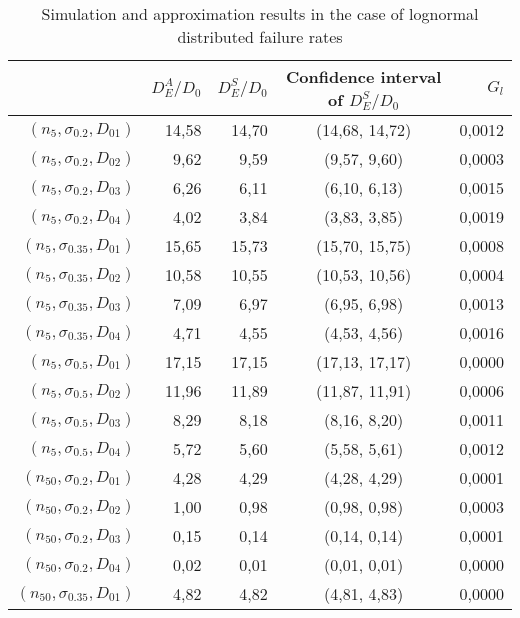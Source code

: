 \documentclass[preprint,12pt]{elsarticle}
\begin{document}
\begin{table}[htbp]
  \centering
  \caption{Simulation and approximation results in the case of lognormal distributed failure rates}
    \begin{tabular}{rrrcr}
    \toprule
          & $D_{E}^{A}/D_0$ & $D_{E}^{S}/D_0$ & Confidence interval of $D_{E}^{S}/D_0$ &  $G_{l}$ \\
    \midrule
    $(n_{5},\sigma_{0.2},D_{01})$ & 14,58 & 14,70 & (14,68, 14,72) & 0,0012 \\
    $(n_{5},\sigma_{0.2},D_{02})$ & 9,62  & 9,59  & (9,57, 9,60) & 0,0003 \\
    $(n_{5},\sigma_{0.2},D_{03})$ & 6,26  & 6,11  & (6,10, 6,13) & 0,0015 \\
    $(n_{5},\sigma_{0.2},D_{04})$ & 4,02  & 3,84  & (3,83, 3,85) & 0,0019 \\
    $(n_{5},\sigma_{0.35},D_{01})$ & 15,65 & 15,73 & (15,70, 15,75) & 0,0008 \\
    $(n_{5},\sigma_{0.35},D_{02})$ & 10,58 & 10,55 & (10,53, 10,56) & 0,0004 \\
    $(n_{5},\sigma_{0.35},D_{03})$& 7,09  & 6,97  & (6,95, 6,98) & 0,0013 \\
    $(n_{5},\sigma_{0.35},D_{04})$ & 4,71  & 4,55  & (4,53, 4,56) & 0,0016 \\
    $(n_{5},\sigma_{0.5},D_{01})$ & 17,15 & 17,15 & (17,13, 17,17) & 0,0000 \\
    $(n_{5},\sigma_{0.5},D_{02})$ & 11,96 & 11,89 & (11,87, 11,91) & 0,0006 \\
    $(n_{5},\sigma_{0.5},D_{03})$ & 8,29  & 8,18  & (8,16, 8,20) & 0,0011 \\
    $(n_{5},\sigma_{0.5},D_{04})$ & 5,72  & 5,60  & (5,58, 5,61) & 0,0012 \\
    $(n_{50},\sigma_{0.2},D_{01})$ & 4,28  & 4,29  & (4,28, 4,29) & 0,0001 \\
    $(n_{50},\sigma_{0.2},D_{02})$ & 1,00  & 0,98  & (0,98, 0,98) & 0,0003 \\
    $(n_{50},\sigma_{0.2},D_{03})$ & 0,15  & 0,14  & (0,14, 0,14) & 0,0001 \\
    $(n_{50},\sigma_{0.2},D_{04})$ & 0,02  & 0,01  & (0,01, 0,01) & 0,0000 \\
    $(n_{50},\sigma_{0.35},D_{01})$ & 4,82  & 4,82  & (4,81, 4,83) & 0,0000 \\

\end{tabular}
\end{table}
\end{document}
